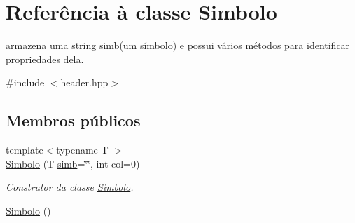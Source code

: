 \hypertarget{class_simbolo}{\section{Referência à classe Simbolo}
\label{class_simbolo}
}


armazena uma string simb(um símbolo) e possui vários métodos para identificar propriedades dela.  




{\ttfamily \#include $<$header.\-hpp$>$}

\subsection*{Membros públicos}
\begin{DoxyCompactItemize}
\item 
{\footnotesize template$<$typename T $>$ }\\\hyperlink{class_simbolo_a1a8737a63b3cce4eaeb6e14be3ab52da}{Simbolo} (T \hyperlink{class_simbolo_a2114c92c128d535912bab50b9406d30e}{simb}=\char`\"{}\char`\"{}, int col=0)
\begin{DoxyCompactList}\small\item\em Construtor da classe \hyperlink{class_simbolo}{Simbolo}. \end{DoxyCompactList}\item 
\hypertarget{class_simbolo_a84bdb92f42513e38a29b0838e6d0e822}{\hyperlink{class_simbolo_a84bdb92f42513e38a29b0838e6d0e822}{Simbolo} ()}\label{class_simbolo_a84bdb92f42513e38a29b0838e6d0e822}


\end{DoxyCompactItemize}
